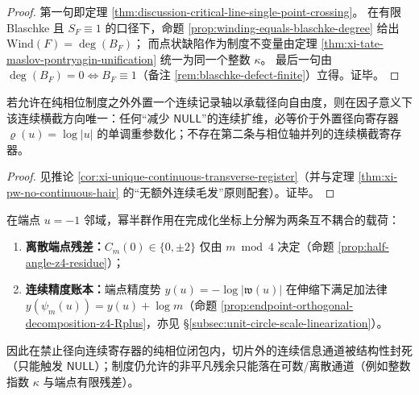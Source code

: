 \begin{proof}
第一句即定理 \ref{thm:discussion-critical-line-single-point-crossing}。
在有限 Blaschke 且 \(S_F\equiv 1\) 的口径下，命题 \ref{prop:winding-equals-blaschke-degree} 给出 \(\mathrm{Wind}(F)=\deg(B_F)\)；
而点状缺陷作为制度不变量由定理 \ref{thm:xi-tate-maslov-pontryagin-unification} 统一为同一个整数 \(\kappa\)。
最后一句由 \(\deg(B_F)=0\iff B_F\equiv 1\)（备注 \ref{rem:blaschke-defect-finite}）立得。证毕。
\end{proof}

\begin{theorem}\label{thm:discussion-unique-continuous-transversal}
若允许在纯相位制度之外外置一个连续记录轴以承载径向自由度，则在因子意义下该连续横截方向唯一：任何“减少 \(\mathsf{NULL}\)”的连续扩维，必等价于外置径向寄存器 \(\varrho(u)=\log|u|\) 的单调重参数化；不存在第二条与相位轴并列的连续横截寄存器。
\end{theorem}

\begin{proof}
见推论 \ref{cor:xi-unique-continuous-transverse-register}（并与定理 \ref{thm:xi-pw-no-continuous-hair} 的“无额外连续毛发”原则配套）。证毕。
\end{proof}

\begin{corollary}\label{cor:discussion-endpoint-discrete-vs-continuous}
在端点 \(u=-1\) 邻域，幂半群作用在完成化坐标上分解为两条互不耦合的载荷：
\begin{enumerate}
  \item \textbf{离散端点残差：}\(C_m(0)\in\{0,\pm 2\}\) 仅由 \(m\bmod 4\) 决定（命题 \ref{prop:half-angle-z4-residue}）；
  \item \textbf{连续精度账本：}端点精度势 \(y(u)=-\log|\mathfrak{w}(u)|\) 在伸缩下满足加法律 \(y(\psi_m(u))=y(u)+\log m\)（命题 \ref{prop:endpoint-orthogonal-decomposition-z4-Rplus}，亦见 \S\ref{subsec:unit-circle-scale-linearization}）。
\end{enumerate}
因此在禁止径向连续寄存器的纯相位闭包内，切片外的连续信息通道被结构性封死（只能触发 \(\mathsf{NULL}\)）；制度仍允许的非平凡残余只能落在可数/离散通道（例如整数指数 \(\kappa\) 与端点有限残差）。
\end{corollary}

